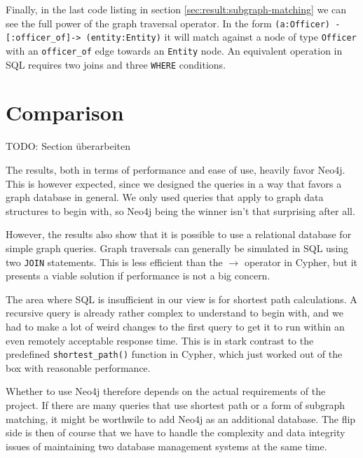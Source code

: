 \documentclass[11pt, a4paper,oneside,chapterprefix=false]{scrbook}
\begin{document}
Finally, in the last code listing in section \ref{sec:result:subgraph-matching} we can see the full power of the graph traversal operator. In the form \lstinline{(a:Officer) -[:officer_of]-> (entity:Entity)} it will match against a node of type \lstinline{Officer} with an \lstinline{officer_of} edge towards an \lstinline{Entity} node. An equivalent operation in SQL requires two joins and three \lstinline{WHERE} conditions.

\section{Comparison}
TODO: Section überarbeiten

The results, both in terms of performance and ease of use, heavily favor Neo4j.
This is however expected, since we designed the queries in a way that favors a graph database in general.
We only used queries that apply to graph data structures to begin with, so Neo4j being the winner isn't that surprising after all.

However, the results also show that it is possible to use a relational database for simple graph queries.
Graph traversals can generally be simulated in SQL using two \lstinline{JOIN} statements.
This is less efficient than the $\rightarrow$ operator in Cypher, but it presents a viable solution if performance is not a big concern.

The area where SQL is insufficient in our view is for shortest path calculations.
A recursive query is already rather complex to understand to begin with, and we had to make a lot of weird changes to the first query to get it to run within an even remotely acceptable response time.
This is in stark contrast to the predefined \lstinline{shortest_path()} function in Cypher, which just worked out of the box with reasonable performance.

Whether to use Neo4j therefore depends on the actual requirements of the project.
If there are many queries that use shortest path or a form of subgraph matching, it might be worthwile to add Neo4j as an additional database.
The flip side is then of course that we have to handle the complexity and data integrity issues of maintaining two database management systems at the same time.
\end{document}
